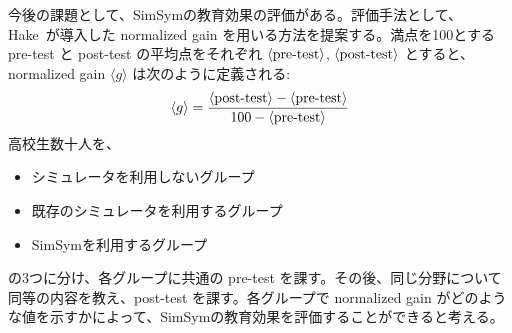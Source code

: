 \documentclass[11pt, a4paper, oneside, twocolumn]{jsarticle}
\newcommand{\simname}{SimSym}
\begin{document}
今後の課題として、\simname の教育効果の評価がある。評価手法として、Hake~\cite{hake_1998}が導入した normalized gain を用いる方法を提案する。満点を100とする pre-test と post-test の平均点をそれぞれ $\langle \textrm{pre\\-test} \rangle$, $\langle \textrm{post\\-test} \rangle$ とすると、normalized gain $\langle g \rangle$ は次のように定義される:
$$ \langle g \rangle = \dfrac{\langle \textrm{post\\-test} \rangle - \langle \textrm{pre\\-test} \rangle}{100 - \langle \textrm{pre\\-test} \rangle} $$
高校生数十人を、
\begin{itemize}
  \item {シミュレータを利用しないグループ}
  \item {既存のシミュレータを利用するグループ}
  \item {\simname を利用するグループ}
\end{itemize}
の3つに分け、各グループに共通の pre-test を課す。その後、同じ分野について同等の内容を教え、post-test を課す。各グループで normalized gain がどのような値を示すかによって、\simname の教育効果を評価することができると考える。


\end{document}
